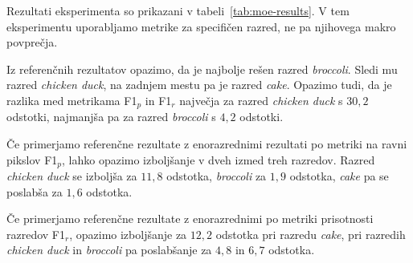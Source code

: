 \documentclass[a4paper,twoside,openright,12pt,slovene]{book}
\begin{document}
            Rezultati eksperimenta so prikazani v
            tabeli~\ref{tab:moe-results}.
            V tem eksperimentu uporabljamo metrike za specifičen razred, ne pa
            njihovega makro povprečja.

            Iz referenčnih rezultatov opazimo, da je najbolje rešen razred
            \textit{broccoli}. Sledi mu razred \textit{chicken duck}, na
            zadnjem mestu pa je razred \textit{cake}. Opazimo tudi, da je
            razlika med metrikama F1$_p$ in F1$_r$ največja za razred
            \textit{chicken duck} s $30{,}2$ odstotki, najmanjša pa za razred
            \textit{broccoli} s $4{,}2$ odstotki.

            Če primerjamo referenčne rezultate z enorazrednimi rezultati po
            metriki na ravni pikslov F1$_p$, lahko opazimo izboljšanje v dveh
            izmed treh razredov. Razred \textit{chicken duck} se izboljša za
            $11{,}8$ odstotka, \textit{broccoli} za $1{,}9$ odstotka,
            \textit{cake} pa se poslabša za $1{,}6$ odstotka.

            Če primerjamo referenčne rezultate z enorazrednimi po metriki
            prisotnosti razredov F1$_r$, opazimo izboljšanje za $12{,}2$
            odstotka pri razredu \textit{cake}, pri razredih \textit{chicken
            duck} in \textit{broccoli} pa poslabšanje za $4{,}8$ in $6{,}7$
            odstotka.
            
\end{document}
